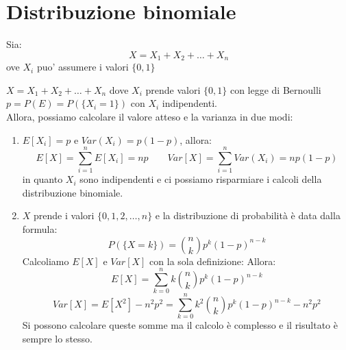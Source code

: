 \documentclass[12pt]{report}
\begin{document}
  	\section{Distribuzione binomiale}
  	Sia:
  	\[
  	X = X_1 + X_2 + \dots + X_n
  	\]
  	ove $X_i$ puo' assumere i valori $\{0, 1\}$

  	$X = X_1 + X_2 + \dots + X_n$ dove $X_i$ prende valori $\{0, 1\}$ con legge di Bernoulli $p = P(E) = P(\{X_i = 1\})$ con $X_i$ indipendenti. \\
  	Allora, possiamo calcolare il valore atteso e la varianza in due modi:
  	\begin{enumerate}
  		\item $E[X_i] = p$ e $Var(X_i) = p(1 - p)$, allora:
  		\[
  		E[X] = \sum_{i=1}^{n}E[X_i] = np \quad \quad Var[X] = \sum_{i=1}^{n}Var(X_i)=np(1-p)
  		\]
  		in quanto $X_i$ sono indipendenti e ci possiamo risparmiare i calcoli della distribuzione binomiale.
  		\item $X$ prende i valori $\{0, 1, 2, \dots, n\}$ e la distribuzione di probabilità è data dalla formula:
  		\[
  		P(\{X = k\}) = \binom{n}{k}p^k(1-p)^{n-k}
  		\]
  		Calcoliamo $E[X]$ e $Var[X]$ con la sola definizione:
  		Allora:
  		\[
  			E[X] = \sum_{k=0}^{n}k\binom{n}{k}p^k(1-p)^{n-k}
  		\]
  		\[
  			Var[X] = E[X^2] - n^2p^2 = \sum_{k=0}^{n}k^2\binom{n}{k}p^k(1-p)^{n-k} - n^2p^2
  		\]
  		Si possono calcolare queste somme ma il calcolo è complesso e il risultato è sempre lo stesso.
  	\end{enumerate}
\end{document}

